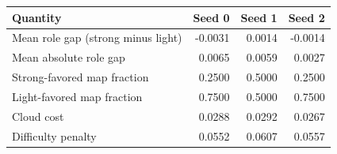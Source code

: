 \begin{tabular}{lrrr}
\toprule
Quantity & Seed 0 & Seed 1 & Seed 2\\
\midrule
Mean role gap (strong minus light) & -0.0031 & 0.0014 & -0.0014\\
Mean absolute role gap & 0.0065 & 0.0059 & 0.0027\\
Strong-favored map fraction & 0.2500 & 0.5000 & 0.2500\\
Light-favored map fraction & 0.7500 & 0.5000 & 0.7500\\
Cloud cost & 0.0288 & 0.0292 & 0.0267\\
Difficulty penalty & 0.0552 & 0.0607 & 0.0557\\
\bottomrule
\end{tabular}
